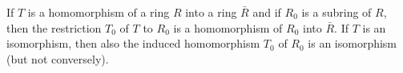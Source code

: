 If $T$ is a homomorphism of a ring $R$ into a ring $\bar{R}$ and if $R_0$ is a subring of $R$, then the restriction $T_0$ of $T$ to $R_0$ is a homomorphism of $R_0$ into $\bar{R}$. If $T$ is an isomorphism, then also the induced homomorphism $T_0$ of $R_0$ is an isomorphism (but not conversely).
